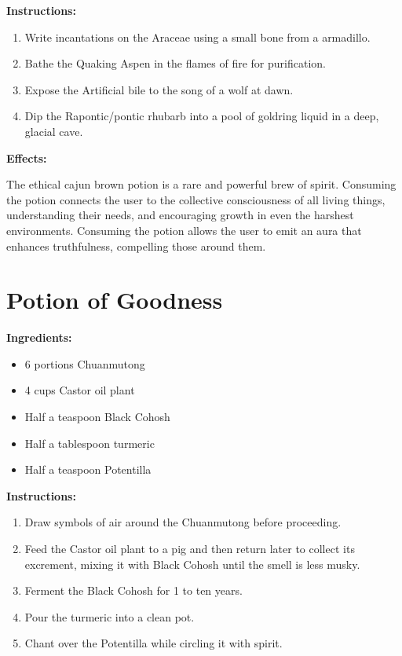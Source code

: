 \documentclass{article}
\begin{document}
\textbf{Instructions:}

\begin{enumerate}
  \item Write incantations on the Araceae using a small bone from a armadillo.
  \item Bathe the Quaking Aspen in the flames of fire for purification.
  \item Expose the Artificial bile to the song of a wolf at dawn.
  \item Dip the Rapontic/pontic rhubarb into a pool of goldring liquid in a deep, glacial cave.
\end{enumerate}

\textbf{Effects:}

The ethical cajun brown potion is a rare and powerful brew of spirit. Consuming the potion connects the user to the collective consciousness of all living things, understanding their needs, and encouraging growth in even the harshest environments. Consuming the potion allows the user to emit an aura that enhances truthfulness, compelling those around them.

\newpage
\section*{Potion of Goodness}

\textbf{Ingredients:}

\begin{itemize}
  \item 6 portions Chuanmutong
  \item 4 cups Castor oil plant
  \item Half a teaspoon Black Cohosh
  \item Half a tablespoon turmeric
  \item Half a teaspoon Potentilla
\end{itemize}

\textbf{Instructions:}

\begin{enumerate}
  \item Draw symbols of air around the Chuanmutong before proceeding.
  \item Feed the Castor oil plant to a pig and then return later to collect its excrement, mixing it with Black Cohosh until the smell is less musky.
  \item Ferment the Black Cohosh for 1 to ten years.
  \item Pour the turmeric into a clean pot.
  \item Chant over the Potentilla while circling it with spirit.
\end{enumerate}
\end{document}
